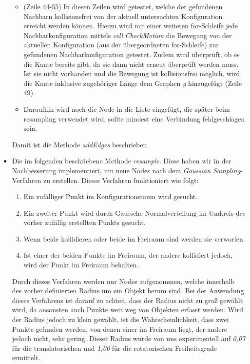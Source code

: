 \documentclass[a4paper]{scrartcl}
\begin{document}
\begin{itemize}
\begin{itemize}
		\item (Zeile 44-55) In diesen Zeilen wird getestet, welche der gefundenen Nachbarn kollisionsfrei von der aktuell untersuchten Konfiguration erreicht werden können. Hierzu wird mit einer weiteren for-Schleife jede Nachbarkonfiguration mittels \textit{cell.CheckMotion} die Bewegung von der aktuellen Konfiguration (aus der übergeordneten for-Schleife) zur gefundenen Nachbarkonfiguration getestet. Zudem wird überprüft, ob es die Kante bereits gibt, da sie dann nicht erneut überprüft werden muss. Ist sie nicht vorhanden und die Bewegung ist kollisionsfrei möglich, wird die Kante inklusive zugehöriger Länge dem Graphen \textit{g} hinzugefügt (Zeile 49).
		\item Daraufhin wird noch die Node in die Liste eingefügt, die später beim resampling verwendet wird, sollte mindest eine Verbindung fehlgeschlagen sein.
	\end{itemize}
	Damit ist die Methode \textit{addEdges} beschrieben.\\
	
	\item Die im folgenden beschriebene Methode \textit{resample}. Diese haben wir in der Nachbesserung implementiert, um neue Nodes nach dem \textit{Gaussian Sampling}-Verfahren zu erstellen. Dieses Verfahren funktioniert wie folgt:
	\begin{enumerate}
		\item Ein zufälliger Punkt im Konfigurationsraum wird gesucht.
		\item Ein zweiter Punkt wird durch Gaussche Normalverteilung im Umkreis des vorher zufällig erstellten Punkts gesucht.
		\item Wenn beide kollidieren oder beide im Freiraum sind werden sie verworfen.
		\item Ist einer der beiden Punkte im Freiraum, der andere kollidiert jedoch, wird der Punkt im Freiraum behalten.
	\end{enumerate} 
	Durch dieses Verfahren werden nur Nodes aufgenommen, welche innerhalb des vorher definierten Radius um ein Objekt herum sind. Bei der Anwendung dieses Verfahrens ist darauf zu achten, dass der Radius nicht zu groß gewählt wird, da ansonsten auch Punkte weit weg von Objekten erfasst werden. Wird der Radius jedoch zu klein gewählt, ist die Wahrscheinlichkeit, dass zwei Punkte gefunden werden, von denen einer im Freiraum liegt, der andere jedoch nicht, sehr gering. Dieser Radius wurde von uns experimentell auf \textit{0,07} für die translatorischen und \textit{1,00} für die rotatorischen Freiheitsgrade ermittelt.\\
	

\end{itemize}
\end{document}
